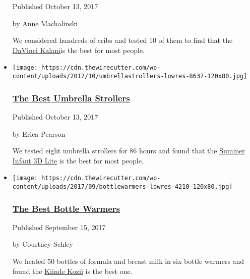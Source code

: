 \begin{itemize}
  Published October 13, 2017

  by Anne Machalinski

  We considered hundreds of cribs and tested 10 of them to find that the
  \href{https://www.nytimes3xbfgragh.onion/wirecutter/out/link/22016/160975/4/64887/?merchant=Wayfair}{DaVinci
  Kalani}is the best for most people.
\item
  \href{https://www.nytimes3xbfgragh.onion/wirecutter/reviews/best-umbrella-strollers/}{}

  \texttt{[image: https://cdn.thewirecutter.com/wp-content/uploads/2017/10/umbrellastrollers-lowres-8637-120x80.jpg]}

  \hypertarget{the-best-umbrella-strollers}{%
  \subsubsection{\texorpdfstring{\href{https://www.nytimes3xbfgragh.onion/wirecutter/reviews/best-umbrella-strollers/}{The
  Best Umbrella
  Strollers}}{The Best Umbrella Strollers}}\label{the-best-umbrella-strollers}}

  Published October 13, 2017

  by Erica Pearson

  We tested eight umbrella strollers for 86 hours and found that the
  \href{https://www.nytimes3xbfgragh.onion/wirecutter/out/link/21994/162133/4/64827/?merchant=Target}{Summer
  Infant 3D Lite} is the best for most people.
\item
  \href{https://www.nytimes3xbfgragh.onion/wirecutter/reviews/best-bottle-warmers/}{}

  \texttt{[image: https://cdn.thewirecutter.com/wp-content/uploads/2017/09/bottlewarmers-lowres-4210-120x80.jpg]}

  \hypertarget{the-best-bottle-warmers}{%
  \subsubsection{\texorpdfstring{\href{https://www.nytimes3xbfgragh.onion/wirecutter/reviews/best-bottle-warmers/}{The
  Best Bottle
  Warmers}}{The Best Bottle Warmers}}\label{the-best-bottle-warmers}}

  Published September 15, 2017

  by Courtney Schley

  We heated 50 bottles of formula and breast milk in six bottle warmers
  and found the
  \href{https://www.nytimes3xbfgragh.onion/wirecutter/out/link/21429/140146/4/63295/?merchant=BuyBuy\%20Baby}{Kiinde
  Kozii} is the best one.
\end{itemize}


